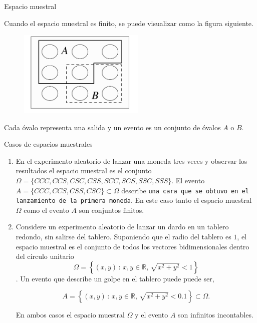 \documentclass{beamer}
\begin{document}
   \begin{frame}{Espacio muestral }
   	
   	Cuando el espacio muestral es finito, se puede visualizar como la figura siguiente. 
   	
   	\begin{figure}[h]
   		\centering
   		\includegraphics[width=6cm]{p1}
   	\end{figure}
   	\small{Cada \'ovalo representa una salida y un evento es un conjunto de \'ovalos $A$ o $B$.}
   	\end{frame}
 \begin{frame}{Casos de espacios muestrales}
 	
\begin{enumerate}
 \item \scriptsize {En el experimento aleatorio de lanzar una moneda tres veces y observar los resultados el espacio muestral es el conjunto $\Omega=\{CCC,CCS,CSC,CSS,SCC,SCS,SSC,SSS\}$. El evento $A=\{CCC,CCS,CSS,CSC\}\subset \Omega$ describe \texttt{una cara que se obtuvo en el lanzamiento de la primera moneda}. En este caso tanto el espacio muestral $\Omega$ como el evento $A$ son conjuntos finitos.}
 
 \item \scriptsize{ Considere un experimento aleatorio de lanzar un dardo en un tablero redondo, sin salirse del tablero. Suponiendo que el radio del tablero es $1$, el espacio muestral  es el conjunto de todos los vectores bidimensionales dentro del c\'irculo unitario $$\Omega=\left\{(x,y)\,:\, x,y\in\mathbb{R}, \,\sqrt{x^2+y^2} < 1\right\}$$. Un evento que describe un golpe en el tablero puede  puede ser,
 
 \[
 A=\left\{(x,y)\, : \,x,y\in\mathbb{R}, \,\sqrt{x^2+y^2} < 0.1\right\}\subset\Omega.
 \]
 
 En ambos casos el espacio muestral $\Omega$ y el evento $A$ son infinitos incontables.}
  \end{enumerate}
\end{frame}
\end{document}
